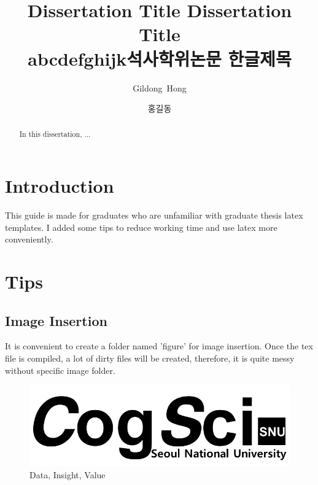 \documentclass[twoside,ms]{snuthesis_utf8}
\title{Dissertation Title Dissertation Title \\abcdefghijk}
\title*{석사학위논문 한글제목}
\author{Gildong~Hong}
\author*{홍길동} %
\begin{document}
\makefrontcover
\makeapproval

\cleardoublepage
\makeagreement

\cleardoublepage
{}

\begin{abstract}
In this dissertation, ...

\end{abstract}
\cleardoublepage

\tableofcontents
{}
\cleardoublepage

\listoftables
{}
\cleardoublepage

\listoffigures
{}
\cleardoublepage


\chapter{Introduction}

This guide is made for graduates who are unfamiliar with graduate thesis latex templates.
I added some tips to reduce working time and use latex more conveniently.

\clearpage
\chapter{Tips}
\section{Image Insertion}
It is convenient to create a folder named 'figure' for image insertion.
Once the tex file is compiled, a lot of dirty files will be created, therefore, it is quite messy without specific image folder.


\begin{figure}[h]
	\centering
	\includegraphics[width=1\textwidth]{figure/cogsci.png}  %
	\caption{Data, Insight, Value}
	\label{fig:div}
\end{figure}
\end{document}
